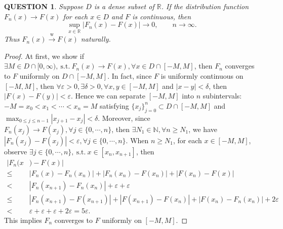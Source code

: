 \documentclass[12pt]{article}
\renewcommand{\(}{\left(}%
\renewcommand{\)}{\right)}%
\renewcommand{\[}{\left[}%
\renewcommand{\]}{\right]}%
\renewcommand{\r}{\mathbb{R}}
\newcommand{\n}{\mathbb{N}}
\newcommand{\st}{\mathrm{\ s.t.\ }}
\newtheorem{question}{QUESTION}[section]}
\newtheorem{proof}{Proof.}}
\begin{document}
  \begin{question}
   Suppose $D$ is a dense subset of $\r$. If the distribution function $F_n(x)\to F(x)$ for each $x\in D$ and $F$ is continuous, then
   \begin{equation*}
    \sup_{x\in\r} |F_n(x)-F(x)|\to 0,\qquad n\to\infty.
   \end{equation*}
   Thus $F_n(x)\overset{\mathrm{w}}{\to}F(x)$ naturally.
  \end{question}
  \begin{proof}
   At first, we show if $\exists M\in D\cap[0,\infty),\st F_n(x)\to F(x),\forall x\in D\cap[-M,M]$, then $F_n$ converges to $F$ uniformly on $D\cap[-M,M]$. In fact, since $F$ is uniformly continuous on $[-M,M]$, then $\forall\varepsilon>0,\exists\delta>0,\forall x,y\in[-M,M]$ and $|x-y|<\delta$, then $|F(x)-F(y)|<\varepsilon$. Hence we can separate $[-M,M]$ into $n$ subintervals: $-M=x_0<x_1<\cdots<x_n=M$ satisfying $\{x_j\}_{j=0}^n\subset D\cap[-M,M]$ and $\max_{0\leq j\leq n-1}|x_{j+1}-x_j|<\delta$. Moreover, since $F_n(x_j)\to F(x_j),\forall j\in\{0,\cdots,n\}$, then $\exists N_1\in\n,\forall n\geq N_1$, we have $|F_n(x_j)-F(x_j)|<\varepsilon,\forall j\in\{0,\cdots,n \}$. When $n\geq N_1$, for each $x\in [-M,M]$, observe $\exists j\in\{0,\cdots,n \},\st x\in[x_n,x_{n+1}]$, then
   \begin{equation*}
    \begin{split}
     |F_n(x&)-F(x)|\\
     \leq& |F_n(x)-F_n(x_n)|+|F_n(x_n)-F(x_n)|+|F(x_n)-F(x)|\\
     < &|F_n(x_{n+1})-F_n(x_n)|+\varepsilon+\varepsilon\\
     \leq &|F_n(x_{n+1})-F(x_{n+1})|+|F(x_{n+1})-F(x_n) |+|F(x_n)-F_n(x_n)|+2\varepsilon\\
     < &\varepsilon+\varepsilon+\varepsilon+2\varepsilon=5\varepsilon.
    \end{split}
   \end{equation*}
   This implies $F_n$ converges to $F$ uniformly on $[-M,M]$.


\end{proof}
\end{document}
